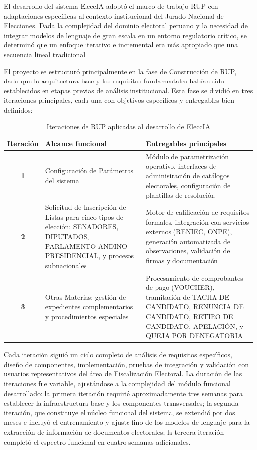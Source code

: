 \documentclass[12pt,a4paper,oneside]{book}
\begin{document}
El desarrollo del sistema EleccIA adoptó el marco de trabajo RUP con adaptaciones específicas al contexto institucional del Jurado Nacional de Elecciones. Dada la complejidad del dominio electoral peruano y la necesidad de integrar modelos de lenguaje de gran escala en un entorno regulatorio crítico, se determinó que un enfoque iterativo e incremental era más apropiado que una secuencia lineal tradicional.

El proyecto se estructuró principalmente en la fase de Construcción de RUP, dado que la arquitectura base y los requisitos fundamentales habían sido establecidos en etapas previas de análisis institucional. Esta fase se dividió en tres iteraciones principales, cada una con objetivos específicos y entregables bien definidos:

\begin{table}[H]
\centering
\caption{Iteraciones de RUP aplicadas al desarrollo de EleccIA}
\label{tab:iteraciones-rup-eleccia}
\begin{tabularx}{\textwidth}{|c|X|X|}
\hline
\textbf{Iteración} & \textbf{Alcance funcional} & \textbf{Entregables principales} \\
\hline
\textbf{1} &
Configuración de Parámetros del sistema &
Módulo de parametrización operativo, interfaces de administración de catálogos electorales, configuración de plantillas de resolución \\
\hline
\textbf{2} &
Solicitud de Inscripción de Listas para cinco tipos de elección: SENADORES, DIPUTADOS, PARLAMENTO ANDINO, PRESIDENCIAL, y procesos subnacionales &
Motor de calificación de requisitos formales, integración con servicios externos (RENIEC, ONPE), generación automatizada de observaciones, validación de firmas y documentación \\
\hline
\textbf{3} &
Otras Materias: gestión de expedientes complementarios y procedimientos especiales &
Procesamiento de comprobantes de pago (VOUCHER), tramitación de TACHA DE CANDIDATO, RENUNCIA DE CANDIDATO, RETIRO DE CANDIDATO, APELACIÓN, y QUEJA POR DENEGATORIA \\
\hline
\end{tabularx}
\end{table}

Cada iteración siguió un ciclo completo de análisis de requisitos específicos, diseño de componentes, implementación, pruebas de integración y validación con usuarios representativos del área de Fiscalización Electoral. La duración de las iteraciones fue variable, ajustándose a la complejidad del módulo funcional desarrollado: la primera iteración requirió aproximadamente tres semanas para establecer la infraestructura base y los componentes transversales; la segunda iteración, que constituye el núcleo funcional del sistema, se extendió por dos meses e incluyó el entrenamiento y ajuste fino de los modelos de lenguaje para la extracción de información de documentos electorales; la tercera iteración completó el espectro funcional en cuatro semanas adicionales.
\end{document}
